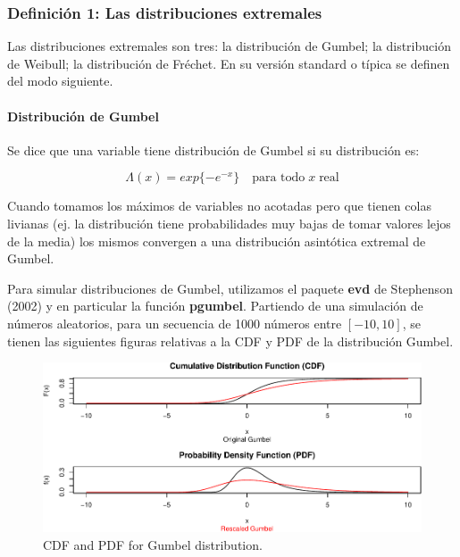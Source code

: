 \documentclass[
  oneside]{article}
\begin{document}
\newpage

\hypertarget{definiciuxf3n-1-las-distribuciones-extremales}{%
\subsubsection{Definición 1: Las distribuciones
extremales}\label{definiciuxf3n-1-las-distribuciones-extremales}}

Las distribuciones extremales son tres: la distribución de Gumbel; la
distribución de Weibull; la distribución de Fréchet. En su versión
standard o típica se definen del modo siguiente.

\hypertarget{distribuciuxf3n-de-gumbel}{%
\paragraph{Distribución de Gumbel}\label{distribuciuxf3n-de-gumbel}}

Se dice que una variable tiene distribución de Gumbel si su distribución
es:

\begin{equation}
\Lambda(x) = exp\{-e^{-x}\} \quad\text{para todo}\; x \;\text{real} 
\end{equation}

Cuando tomamos los máximos de variables no acotadas pero que tienen
colas livianas (ej. la distribución tiene probabilidades muy bajas de
tomar valores lejos de la media) los mismos convergen a una distribución
asintótica extremal de Gumbel.

Para simular distribuciones de Gumbel, utilizamos el paquete
\textbf{evd} de Stephenson (2002) y en particular la función
\textbf{pgumbel}. Partiendo de una simulación de números aleatorios,
para un secuencia de 1000 números entre \([-10,10]\), se tienen las
siguientes figuras relativas a la CDF y PDF de la distribución Gumbel.

\begin{figure}
\centering
\includegraphics{main_files/figure-latex/gumbel_plots-1.pdf}
\caption{CDF and PDF for Gumbel distribution.}
\end{figure}
\end{document}
